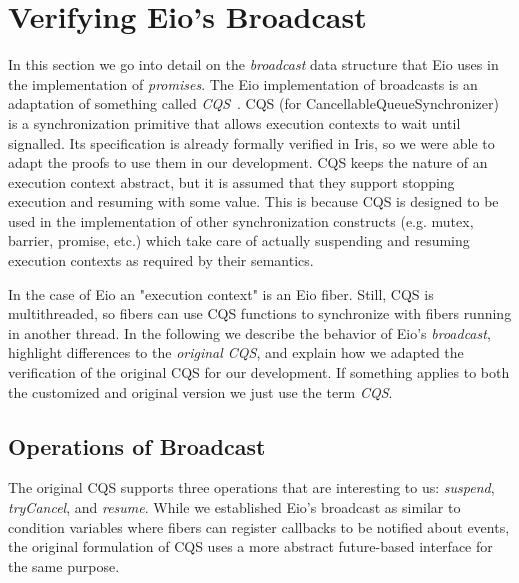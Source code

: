 \section{Verifying Eio's Broadcast}
\label{sec:broadcast}


In this section we go into detail on the \emph{broadcast} data structure that Eio uses in the implementation of \emph{promises}.
The Eio implementation of broadcasts is an adaptation of something called \emph{CQS}~\cite{koval2023cqs}.
CQS (for CancellableQueueSynchronizer) is a synchronization primitive that allows execution contexts to wait until signalled.
Its specification is already formally verified in Iris, so we were able to adapt the proofs to use them in our development.
CQS keeps the nature of an execution context abstract, but it is assumed that they support stopping execution and resuming with some value.
This is because CQS is designed to be used in the implementation of other synchronization constructs (e.g. mutex, barrier, promise, etc.) which take care of actually suspending and resuming execution contexts as required by their semantics.


In the case of Eio an "execution context" is an Eio fiber.
Still, CQS is multithreaded, so fibers can use CQS functions to synchronize with fibers running in another thread.
In the following we describe the behavior of Eio's \emph{broadcast}, highlight differences to the \emph{original CQS}, and explain how we adapted the verification of the original CQS for our development.
If something applies to both the customized and original version we just use the term \emph{CQS}.

\subsection{Operations of Broadcast}
\label{sec:broadcast-operations}


The original CQS supports three operations that are interesting to us: \emph{suspend}, \emph{tryCancel}, and \emph{resume}.
While we established Eio's broadcast as similar to condition variables where fibers can register callbacks to be notified about events, the original formulation of CQS uses a more abstract future-based interface for the same purpose.

